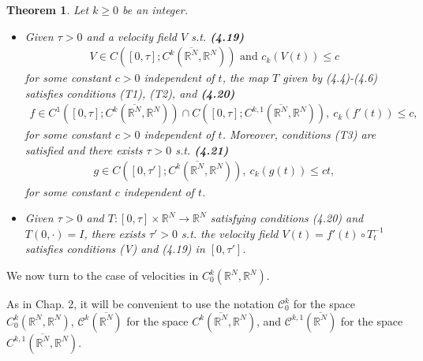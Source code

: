 \documentclass{book}
\numberwithin{equation}{section}
\newtheorem{theorem}{Theorem}[section]
\begin{document}
\begin{enumerate}
    \begin{theorem}
        Let $k\ge 0$ be an integer.
        \begin{itemize}
            \item[(i)] Given $\tau > 0$ and a velocity field $V$ s.t. \textbf{(4.19)}
            \begin{align*}
                V\in C\left([0,\tau];C^k(\overline{\mathbb{R}^N},\mathbb{R}^N)\right) \mbox{ and } c_k\left(V(t)\right)\le c
            \end{align*}
            for some constant $c > 0$ independent of $t$, the map $T$ given by (4.4)-(4.6) satisfies conditions (T1), (T2), and \textbf{(4.20)}
            \begin{align*}
                f\in C^1\left([0,\tau];C^k(\overline{\mathbb{R}^N},\mathbb{R}^N)\right)\cap C\left([0,\tau];C^{k,1}(\overline{\mathbb{R}^N},\mathbb{R}^N)\right),\ c_k\left(f'(t)\right)\le c,
            \end{align*}
            for some constant $c > 0$ independent of $t$. Moreover, conditions (T3) are satisfied and there exists $\tau > 0$ s.t. \textbf{(4.21)}
            \begin{align*}
                g\in C\left([0,\tau'];C^k(\overline{\mathbb{R}^N},\mathbb{R}^N)\right), \ c_k\left(g(t)\right)\le ct,
            \end{align*}
            for some constant $c$ independent of $t$.
            \item[(ii)] Given $\tau > 0$ and $T:[0,\tau]\times\mathbb{R}^N\to\mathbb{R}^N$ satisfying conditions (4.20) and $T(0,\cdot) = I$, there exists $\tau' > 0$ s.t. the velocity field $V(t) = f'(t)\circ T_t^{-1}$ satisfies conditions (V) and (4.19) in $[0,\tau']$.
        \end{itemize}
    \end{theorem}
    We now turn to the case of velocities in $C_0^k(\mathbb{R}^N,\mathbb{R}^N)$.
    
    As in Chap. 2, it will be convenient to use the notation $\mathcal{C}_0^k$ for the space $C_0^k(\mathbb{R}^N,\mathbb{R}^N)$, $\mathcal{C}^k(\overline{\mathbb{R}^N})$ for the space $C^k(\overline{\mathbb{R}^N},\mathbb{R}^N)$, and $\mathcal{C}^{k,1}(\overline{\mathbb{R}^N})$ for the space $C^{k,1}(\overline{\mathbb{R}^N},\mathbb{R}^N)$.
    

\end{enumerate}
\end{document}
